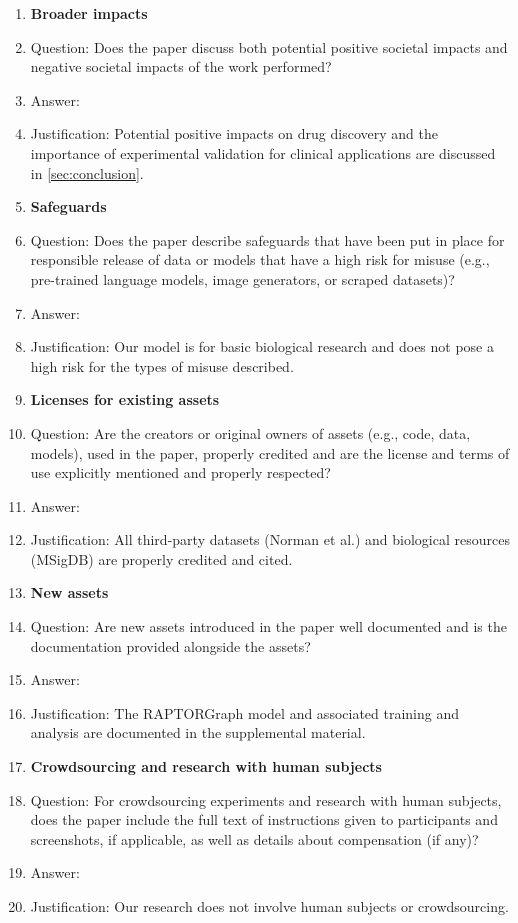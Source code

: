 \begin{enumerate}
\item {\bf Broader impacts}
    \item[] Question: Does the paper discuss both potential positive societal impacts and negative societal impacts of the work performed?
    \item[] Answer: \answerYes{}
    \item[] Justification: Potential positive impacts on drug discovery and the importance of experimental validation for clinical applications are discussed in \cref{sec:conclusion}.

\item {\bf Safeguards}
    \item[] Question: Does the paper describe safeguards that have been put in place for responsible release of data or models that have a high risk for misuse (e.g., pre-trained language models, image generators, or scraped datasets)?
    \item[] Answer: \answerNA{}
    \item[] Justification: Our model is for basic biological research and does not pose a high risk for the types of misuse described.

\item {\bf Licenses for existing assets}
    \item[] Question: Are the creators or original owners of assets (e.g., code, data, models), used in the paper, properly credited and are the license and terms of use explicitly mentioned and properly respected?
    \item[] Answer: \answerYes{}
    \item[] Justification: All third-party datasets (Norman et al.) and biological resources (MSigDB) are properly credited and cited.

\item {\bf New assets}
    \item[] Question: Are new assets introduced in the paper well documented and is the documentation provided alongside the assets?
    \item[] Answer: \answerYes{}
    \item[] Justification: The RAPTORGraph model and associated training and analysis are documented in the supplemental material.

\item {\bf Crowdsourcing and research with human subjects}
    \item[] Question: For crowdsourcing experiments and research with human subjects, does the paper include the full text of instructions given to participants and screenshots, if applicable, as well as details about compensation (if any)?
    \item[] Answer: \answerNA{}
    \item[] Justification: Our research does not involve human subjects or crowdsourcing.


\end{enumerate}

